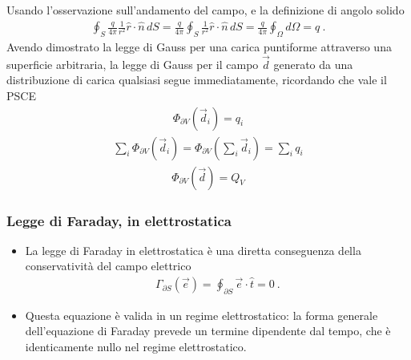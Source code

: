 \documentclass[letterpaper,10pt,italian]{jupyterBook}
\begin{document}
\sphinxAtStartPar
{}
Usando l’osservazione sull’andamento del campo, e la definizione di angolo solido
\begin{equation*}
\begin{split}
\oint_S \frac{q}{4 \pi} \frac{1}{r^2} \hat{r} \cdot \hat{n} \, dS =
\frac{q}{4 \pi} \oint_S \frac{1}{r^2} \hat{r} \cdot \hat{n} \, dS =
\frac{q}{4 \pi} \oint_{\Omega} d \Omega = q \ .
\end{split}
\end{equation*}
\sphinxAtStartPar
{}
Avendo dimostrato la legge di Gauss per una carica puntiforme attraverso una superficie arbitraria, la legge di Gauss per il campo \(\vec{d}\) generato da una distribuzione di carica qualsiasi segue immediatamente, ricordando che vale il PSCE
\begin{equation*}
\begin{split}\Phi_{\partial V}(\vec{d}_i) = q_i\end{split}
\end{equation*}\begin{equation*}
\begin{split}\sum_i \Phi_{\partial V}(\vec{d}_i) = \Phi_{\partial V} \left(\sum_i \vec{d}_i \right) = \sum_i q_i\end{split}
\end{equation*}\begin{equation*}
\begin{split}\Phi_{\partial V}(\vec{d}) = Q_V\end{split}
\end{equation*}

\subsubsection{Legge di Faraday, in elettrostatica}
\label{\detokenize{ch/electromagnetism/electrostatics:legge-di-faraday-in-elettrostatica}}\label{\detokenize{ch/electromagnetism/electrostatics:physics-hs-electromagnetism-electrostatics-maxwell-faraday}}\begin{itemize}
\item {} 
\sphinxAtStartPar
La legge di Faraday in elettrostatica è una diretta conseguenza della conservatività del campo elettrico
\begin{equation}\label{equation:ch/electromagnetism/electrostatics:eq:faraday:steady}
\begin{split}\Gamma_{\partial S}(\vec{e}) = \oint_{\partial S} \vec{e} \cdot \hat{t} = 0 \ .\end{split}
\end{equation}
\item {} 
\sphinxAtStartPar
Questa equazione è valida  in un regime elettrostatico: la forma generale dell’equazione di Faraday prevede un termine dipendente dal tempo, che è identicamente nullo nel regime elettrostatico.

\end{itemize}
\end{document}
